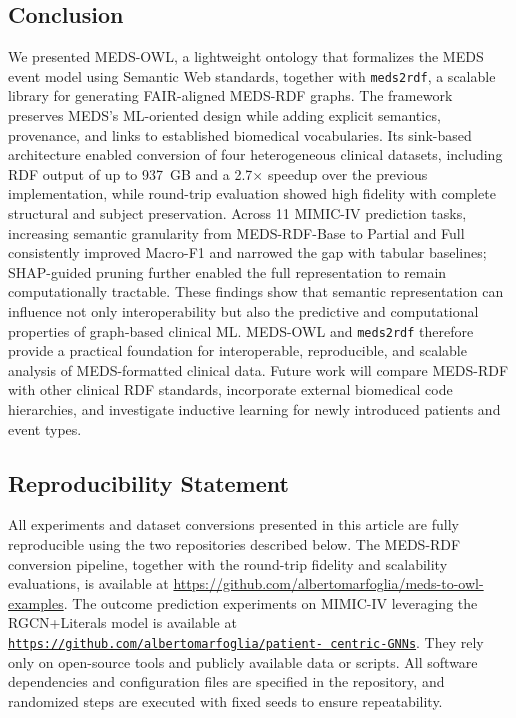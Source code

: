 \subsection{Conclusion}\label{sec:paper3_conclusion}
We presented MEDS-OWL, a lightweight ontology that formalizes the MEDS event model using Semantic Web standards, together with \texttt{meds2rdf}, a scalable library for generating FAIR-aligned MEDS-RDF graphs. The framework preserves MEDS's ML-oriented design while adding explicit semantics, provenance, and links to established biomedical vocabularies. Its sink-based architecture enabled conversion of four heterogeneous clinical datasets, including RDF output of up to 937~GB and a 2.7$\times$ speedup over the previous implementation, while round-trip evaluation showed high fidelity with complete structural and subject preservation. Across 11 MIMIC-IV prediction tasks, increasing semantic granularity from MEDS-RDF-Base to Partial and Full consistently improved Macro-F1 and narrowed the gap with tabular baselines; SHAP-guided pruning further enabled the full representation to remain computationally tractable. These findings show that semantic representation can influence not only interoperability but also the predictive and computational properties of graph-based clinical ML. MEDS-OWL and \texttt{meds2rdf} therefore provide a practical foundation for interoperable, reproducible, and scalable analysis of MEDS-formatted clinical data. Future work will compare MEDS-RDF with other clinical RDF standards, incorporate external biomedical code hierarchies, and investigate inductive learning for newly introduced patients and event types.

\subsection*{Reproducibility Statement}
All experiments and dataset conversions presented in this article are fully reproducible using the two repositories described below.
The MEDS-RDF conversion pipeline, together with the round-trip fidelity and scalability evaluations, is available at \url{https://github.com/albertomarfoglia/meds-to-owl-examples}. The outcome prediction experiments on MIMIC-IV leveraging the RGCN+Literals model is available at \href{https://github.com/albertomarfoglia/patient-centric-GNNs}{\texttt{https://github.com/albertomarfoglia/patient- centric-GNNs}}.
They rely only on open-source tools and publicly available data or scripts. All software dependencies and configuration files are specified in the repository, and randomized steps are executed with fixed seeds to ensure repeatability.

